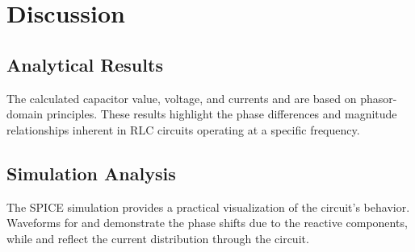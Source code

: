 \chapter{Discussion}

\section{Analytical Results}

The calculated capacitor value, voltage, and currents  and  are based on phasor-domain principles. These results highlight the phase differences and magnitude relationships inherent in RLC circuits operating at a specific frequency.

\section{Simulation Analysis}
The SPICE simulation provides a practical visualization of the circuit’s behavior. Waveforms for  and  demonstrate the phase shifts due to the reactive components, while  and  reflect the current distribution through the circuit.

